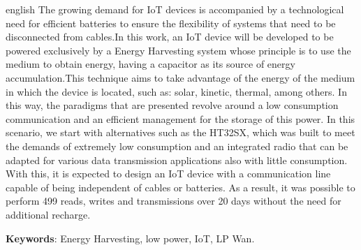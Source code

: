 \begin{resumo}[Abstract]
 \begin{otherlanguage*}{english}
The growing demand for IoT devices is accompanied by a technological need for efficient batteries to ensure the flexibility of systems that need to be disconnected from cables.In this work, an IoT device will be developed to be powered exclusively by a Energy Harvesting system whose principle is to use the medium to obtain energy, having a capacitor as its source of energy accumulation.This technique aims to take advantage of the energy of the medium in which the device is located, such as: solar, kinetic, thermal, among others. In this way, the paradigms that are presented revolve around a low consumption communication and an efficient management for the storage of this power. In this scenario, we start with alternatives such as the HT32SX, which was built to meet the demands of extremely low consumption and an integrated radio that can be adapted for various data transmission applications also with little consumption. With this, it is expected to design an IoT device with a communication line capable of being independent of cables or batteries. As a result, it was possible to perform 499 reads, writes and transmissions over 20 days without the need for additional recharge.

   \vspace{\onelineskip}
 
   \noindent 
   \textbf{Keywords}: Energy Harvesting, low power, IoT, LP Wan.
 \end{otherlanguage*}
\end{resumo}


\listoffigures*
\cleardoublepage

\listofquadros*
\cleardoublepage

\listoftables*
\cleardoublepage

